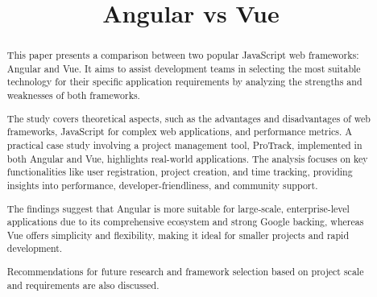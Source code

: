 \documentclass[conference]{IEEEtran}
\begin{document}
\title{Angular vs Vue\\
}

\author{
\and
{}
\and
{}
}

\maketitle

\begin{abstract}
This paper presents a comparison between two popular JavaScript web frameworks: Angular and Vue. It aims to assist development teams in selecting the most suitable technology for their specific application requirements by analyzing the strengths and weaknesses of both frameworks.

The study covers theoretical aspects, such as the advantages and disadvantages of web frameworks, JavaScript for complex web applications, and performance metrics. A practical case study involving a project management tool, ProTrack, implemented in both Angular and Vue, highlights real-world applications. The analysis focuses on key functionalities like user registration, project creation, and time tracking, providing insights into performance, developer-friendliness, and community support.

The findings suggest that Angular is more suitable for large-scale, enterprise-level applications due to its comprehensive ecosystem and strong Google backing, whereas Vue offers simplicity and flexibility, making it ideal for smaller projects and rapid development.

Recommendations for future research and framework selection based on project scale and requirements are also discussed.
\end{abstract}
\end{document}
